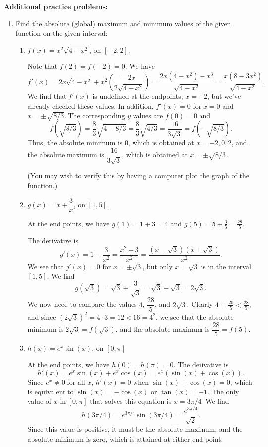 \documentclass[12pt]{article}
\begin{document}
\textbf{Additional practice problems:}
\begin{enumerate}
\item Find the absolute (global) maximum and minimum values of the given function on the given interval:
\begin{enumerate}
\item $f(x) = x^2\sqrt{4-x^2}$, on $[-2,2]$.

Note that $f(2)=f(-2)=0$. We have
\[
f'(x) = 2x\sqrt{4-x^2}+x^2\left(\frac{-2x}{2\sqrt{4-x^2}}\right)=\frac{2x(4-x^2)-x^3}{\sqrt{4-x^2}}=\frac{x(8-3x^2)}{\sqrt{4-x^2}}.
\]
We find that $f'(x)$ is undefined at the endpoints, $x=\pm 2$, but we've already checked these values. In addition, $f'(x)=0$ for $x=0$ and $x=\pm\sqrt{8/3}$. The corresponding $y$ values are $f(0)=0$ and
\[
f(\sqrt{8/3}) = \frac{8}{3}\sqrt{4-8/3} = \frac{8}{3}\sqrt{4/3}=\frac{16}{3\sqrt{3}}=f(-\sqrt{8/3}).
\]
Thus, the absolute minimum is $0$, which is obtained at $x=-2,0,2$, and the absolute maximum is $\dfrac{16}{3\sqrt{3}}$, which is obtained at $x=\pm \sqrt{8/3}$.

(You may wish to verify this by having a computer plot the graph of the function.)

\item $g(x) = x+\dfrac{3}{x}$, on $[1,5]$.

At the end points, we have $g(1) = 1+3=4$ and $g(5) = 5+\frac{3}{5}=\frac{28}{5}$.

The derivative is
\[
g'(x) = 1-\frac{3}{x^2} = \frac{x^2-3}{x^2} = \frac{(x-\sqrt{3})(x+\sqrt{3})}{x^2}.
\]
We see that $g'(x)=0$ for $x=\pm \sqrt{3}$, but only $x=\sqrt{3}$ is in the interval $[1,5]$. We find
\[
g(\sqrt{3}) = \sqrt{3}+\frac{3}{\sqrt{3}}=\sqrt{3}+\sqrt{3}=2\sqrt{3}.
\]
We now need to compare the values $4$, $\dfrac{28}{5}$, and $2\sqrt{3}$. Clearly $4=\frac{20}{5}<\frac{28}{5}$, and since $(2\sqrt{3})^2 = 4\cdot 3=12<16=4^2$, we see that the absolute minimum is $2\sqrt{3}=f(\sqrt{3})$, and the absolute maximum is $\dfrac{28}{5}=f(5)$.

\item $h(x) = e^x\sin(x)$, on $[0,\pi]$

At the end points, we have $h(0)=h(\pi)=0$. The derivative is
\[
h'(x) = e^x\sin(x)+e^x\cos(x)=e^x(\sin(x)+\cos(x)).
\]
Since $e^x\neq 0$ for all $x$, $h'(x)=0$ when $\sin(x)+\cos(x)=0$, which is equivalent to $\sin(x)=-\cos(x)$ or $\tan(x)=-1$. The only value of $x$ in $[0,\pi]$ that solves this equation is $x=3\pi/4$. We find
\[
h(3\pi/4) = e^{3\pi/4}\sin(3\pi/4) = \frac{e^{3\pi/4}}{\sqrt{2}}.
\]
Since this value is positive, it must be the absolute maximum, and the absolute minimum is zero, which is attained at either end point.
\end{enumerate}


\end{enumerate}
\end{document}
